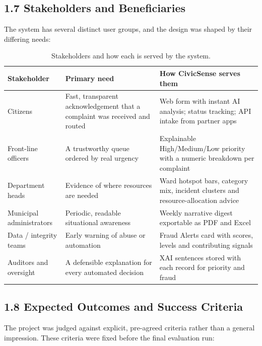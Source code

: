 \documentclass[10pt,letterpaper,oneside]{article}\usepackage{geometry}\geometry{top=1in,bottom=1in,left=1in,right=1in,includeheadfoot}\usepackage{xcolor}\definecolor{color@navy}{HTML}{1F3B63}\definecolor{color@grey}{HTML}{404040}\definecolor{color@hdr}{HTML}{F2F4F7}\usepackage{titlesec}\titleformat{\section}  {\normalfont\huge\bfseries\color@navy}  {}{0pt}{\MakeUppercase}\titleformat{\subsection}  {\normalfont\Large\bfseries\color@navy}  {}{0pt}{}\titleformat{\subsubsection}  {\normalfont\large\bfseries\color@navy}  {}{0pt}{}\titlespacing*{\section}{0pt}{14pt}{6pt}\titlespacing*{\subsection}{0pt}{10pt}{4pt}\titlespacing*{\subsubsection}{0pt}{8pt}{3pt}\setlength{\parindent}{0pt}\setlength{\parskip}{0.6em}\parindent=0pt\usepackage{enumitem}\setlist{nosep,leftmargin=*,itemsep=0pt,topsep=2pt,partopsep=0pt}\usepackage{array}\usepackage{booktabs}\usepackage{caption}\captionsetup{font={small,it},labelfont={bf},labelsep=period,  parskip=2pt,skip=4pt,list=no}\captionsetup[table]{labelfont={bf,small,color@navy},name=Table}\usepackage{graphicx}\usepackage{verbatim}\usepackage{ragged2e}\usepackage{longtable}\usepackage{tabularx}\usepackage{multirow}\usepackage{colortbl}\definecolor{rowshade}{HTML}{F2F4F7}\usepackage{tikz}\usetikzlibrary{positioning,calc}\usepackage[hidelinks]{hyperref}\hypersetup{colorlinks=true,linkcolor=color@navy,urlcolor=color@navy}\pagestyle{fancy}\fancyhf{}\renewcommand{\headrulewidth}{0.4pt}\fancyhead[L]{\small\color@navy CivicSense — Project Report}\fancyhead[R]{\small\color@grey October 11, 2026}\fancyfoot[C]{\small\color@grey An Integrated Intelligent Triage Pipelin}\fancyfoot[R]{\small\color@grey Page \thepage}\usepackage{setspace}\setstretch{1.15}\AtBeginDocument{  \hypersetup{pdftitle={An Integrated Intelligent Triage Pipeline for AI-Enhanced Citizen Complaint Management},    pdfauthor={CivicSense Project Team},    pdfsubject={Project Report},    pdfkeywords={smart cities, NLP, complaint management, e-governance},    pdfcreator={CivicSense Project Team}  }}
\begin{document}
\subsection*{1.7 Stakeholders and Beneficiaries}
The system has several distinct user groups, and the design was shaped by their differing needs:

\begin{table}[htbp]
\centering
\small
\begin{tabular}{@{}lll@{}}
\toprule
Stakeholder & Primary need & How CivicSense serves them \\
\midrule
Citizens & Fast, transparent acknowledgement that a complaint was received and routed & Web form with instant AI analysis; status tracking; API intake from partner apps \\
Front-line officers & A trustworthy queue ordered by real urgency & Explainable High/Medium/Low priority with a numeric breakdown per complaint \\
Department heads & Evidence of where resources are needed & Ward hotspot bars, category mix, incident clusters and resource-allocation advice \\
Municipal administrators & Periodic, readable situational awareness & Weekly narrative digest exportable as PDF and Excel \\
Data / integrity teams & Early warning of abuse or automation & Fraud Alerts card with scores, levels and contributing signals \\
Auditors and oversight & A defensible explanation for every automated decision & XAI sentences stored with each record for priority and fraud \\
\bottomrule
\end{tabular}
\caption{Stakeholders and how each is served by the system.}
\end{table}

\subsection*{1.8 Expected Outcomes and Success Criteria}
The project was judged against explicit, pre-agreed criteria rather than a general impression. These criteria were fixed before the final evaluation run:
\end{document}
